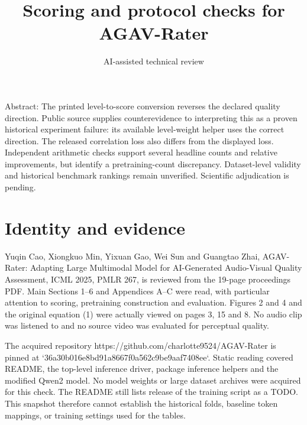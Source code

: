\documentclass[10pt]{article}
\title{Scoring and protocol checks for AGAV-Rater}
\author{AI-assisted technical review}
\date{}
\begin{document}
\maketitle
Abstract: The printed level-to-score conversion reverses the declared quality direction. Public source supplies counterevidence to interpreting this as a proven historical experiment failure: its available level-weight helper uses the correct direction. The released correlation loss also differs from the displayed loss. Independent arithmetic checks support several headline counts and relative improvements, but identify a pretraining-count discrepancy. Dataset-level validity and historical benchmark rankings remain unverified. Scientific adjudication is pending.\par
\section*{Identity and evidence}
Yuqin Cao, Xiongkuo Min, Yixuan Gao, Wei Sun and Guangtao Zhai, AGAV-Rater: Adapting Large Multimodal Model for AI-Generated Audio-Visual Quality Assessment, ICML 2025, PMLR 267, is reviewed from the 19-page proceedings PDF. Main Sections 1–6 and Appendices A–C were read, with particular attention to scoring, pretraining construction and evaluation. Figures 2 and 4 and the original equation (1) were actually viewed on pages 3, 15 and 8. No audio clip was listened to and no source video was evaluated for perceptual quality.\par
The acquired repository https://github.com/charlotte9524/AGAV-Rater is pinned at `36a30b016e8bd91a8667f0a562c9be9aaf7408ee`. Static reading covered README, the top-level inference driver, package inference helpers and the modified Qwen2 model. No model weights or large dataset archives were acquired for this check. The README still lists release of the training script as a TODO. This snapshot therefore cannot establish the historical folds, baseline token mappings, or training settings used for the tables.\par
\end{document}
